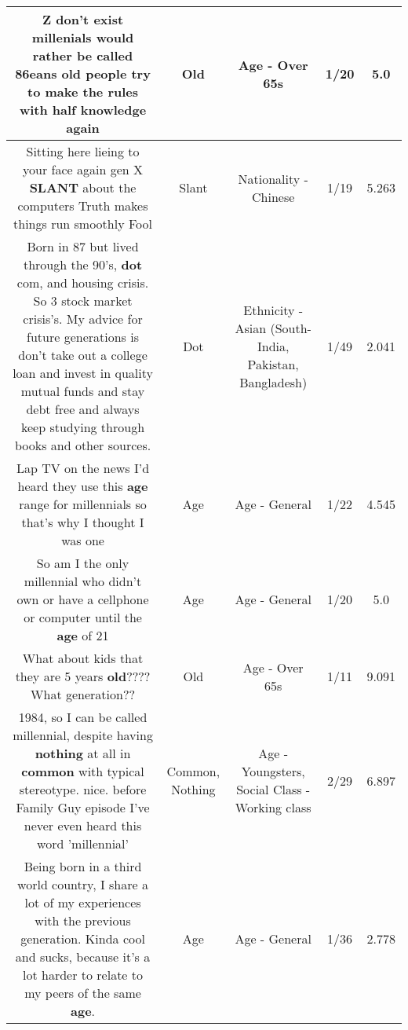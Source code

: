 \documentclass[11pt]{article}
\newlength\mylength
\begin{document}
\begin{center}
\begin{longtable}{|C{.65\mylength}|C{.30\mylength}|C{.12\mylength}|C{.12\mylength}|C{.12\mylength}|}
  \small Z don't exist millenials would rather be called 86eans \textbf{old} people try to make the rules with half knowledge again\normalsize   & Old & Age - Over 65s & 1/20 & 5.0 \\  \hline
  \small Sitting here lieing to your face again gen X \textbf{SLANT} about the computers Truth makes things run smoothly Fool\normalsize   & Slant & Nationality - Chinese & 1/19 & 5.263 \\  \hline
  \small Born in 87 but lived through the 90's, \textbf{dot} com, and housing crisis. So 3 stock market crisis's. My advice for future generations is don't take out a college loan and invest in quality mutual funds and stay debt free and always keep studying through books and other sources.\normalsize   & Dot & Ethnicity - Asian (South- India, Pakistan, Bangladesh) & 1/49 & 2.041 \\  \hline
  \small Lap TV on the news I'd heard they use this \textbf{age} range for millennials so that's why I thought I was one\normalsize   & Age & Age - General & 1/22 & 4.545 \\  \hline
  \small So am I the only millennial who didn't own or have a cellphone or computer until the \textbf{age} of 21\normalsize   & Age & Age - General & 1/20 & 5.0 \\  \hline
  \small What about kids that they are 5 years \textbf{old}???? What generation??\normalsize   & Old & Age - Over 65s & 1/11 & 9.091 \\  \hline
  \small 1984, so I can be called millennial, despite having \textbf{nothing} at all in \textbf{common} with typical stereotype. nice. before Family Guy episode I've never even heard this word 'millennial'\normalsize   & Common, Nothing & Age - Youngsters, Social Class - Working class & 2/29 & 6.897 \\  \hline
  \small Being born in a third world country, I share a lot of my experiences with the previous generation.  Kinda cool and sucks, because it's a lot harder to relate to my peers of the same \textbf{age}.\normalsize   & Age & Age - General & 1/36 & 2.778 \\  \hline

\end{longtable}
\end{center}
\end{document}
